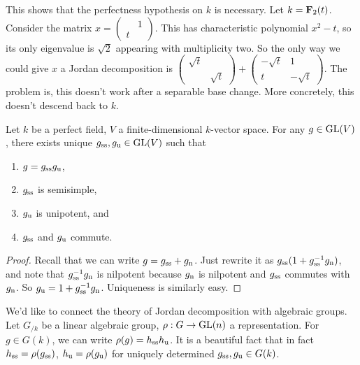 \begin{example}
This shows that the perfectness hypothesis on $k$ is necessary. Let 
$k=\mathbf{F}_2(t)$. Consider the matrix $x=\begin{pmatrix} & 1 \\ t \end{pmatrix}$. 
This has characteristic polynomial $x^2-t$, so its only eigenvalue is 
$\sqrt 2$ appearing with multiplicity two. So the only way we could 
give $x$ a Jordan decomposition is 
$\begin{pmatrix} \sqrt t \\ & \sqrt t\end{pmatrix} + \begin{pmatrix} -\sqrt t & 1 \\ t & -\sqrt t\end{pmatrix}$. 
The problem is, this doesn't work after a separable base change. More 
concretely, this doesn't descend back to $k$. 
\end{example}

\begin{theorem}
Let $k$ be a perfect field, $V$ a finite-dimensional $k$-vector space. For any 
$g\in \operatorname{GL}(V)$, there exists unique $g_{\mathrm{ss}}, g_{\mathrm{u}}\in \operatorname{GL}(V)$ such 
that 
\begin{enumerate}
  \item $g=g_{\mathrm{ss}} g_{\mathrm{u}}$, 
  \item $g_{\mathrm{ss}}$ is semisimple, 
  \item $g_{\mathrm{u}}$ is unipotent, and 
  \item $g_{\mathrm{ss}}$ and $g_{\mathrm{u}}$ commute. 
\end{enumerate}
\end{theorem}
\begin{proof}
Recall that we can write $g=g_{\mathrm{ss}}+g_{\mathrm{n}}$. Just rewrite it as 
$g_{\mathrm{ss}}(1+g_{\mathrm{ss}}^{-1} g_{\mathrm{n}})$, and note that 
$g_{\mathrm{ss}}^{-1} g_{\mathrm{n}}$ is nilpotent because 
$g_{\mathrm{n}}$ is nilpotent and $g_{\mathrm{ss}}$ commutes with $g_{\mathrm{n}}$. 
So $g_{\mathrm{u}} = 1+g_{\mathrm{ss}}^{-1} g_{\mathrm{n}}$. Uniqueness is similarly 
easy. 
\end{proof}

We'd like to connect the theory of Jordan decomposition with algebraic groups. 
Let $G_{/k}$ be a linear algebraic group, $\rho:G\to \operatorname{GL}(n)$ a representation. 
For $g\in G(k)$, we can write $\rho(g)=h_{\mathrm{ss}} h_{\mathrm{u}}$. It is a 
beautiful fact that in fact $h_{\mathrm{ss}}=\rho(g_{\mathrm{ss}})$, 
$h_{\mathrm{u}}=\rho(g_{\mathrm{u}})$ for uniquely determined 
$g_{\mathrm{ss}}, g_{\mathrm{u}}\in G(k)$. 

